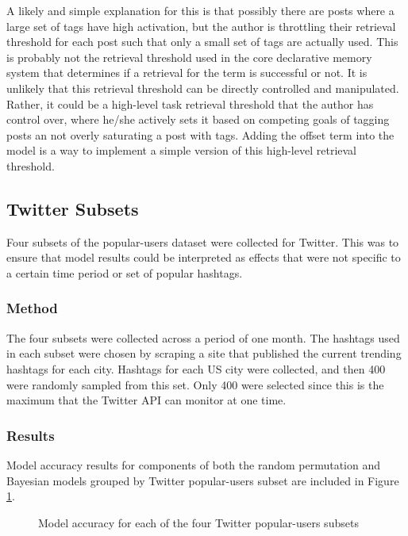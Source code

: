 \documentclass[man,floatsintext,donotrepeattitle]{apa6}
\begin{document}
A likely and simple explanation for this is that possibly there are posts where a large set of tags have high activation,
but the author is throttling their retrieval threshold for each post such that only a small set of tags are actually used.
This is probably not the retrieval threshold used in the core declarative memory system that determines if a retrieval for the term is successful or not.
It is unlikely that this retrieval threshold can be directly controlled and manipulated.
Rather, it could be a high-level task retrieval threshold that the author has control over, where he/she actively sets it based on competing goals of tagging posts an not overly saturating a post with tags.
Adding the offset term into the model is a way to implement a simple version of this high-level retrieval threshold.

\subsection{Twitter Subsets}

Four subsets of the popular-users dataset were collected for Twitter.
This was to ensure that model results could be interpreted as effects that were not specific to a certain time period or set of popular hashtags.

\subsubsection{Method}

The four subsets were collected across a period of one month.
The hashtags used in each subset were chosen by scraping a site that published the current trending hashtags for each city.
Hashtags for each US city were collected, and then 400 were randomly sampled from this set.
Only 400 were selected since this is the maximum that the Twitter API can monitor at one time.

\subsubsection{Results}

Model accuracy results for components of both the random permutation and Bayesian models grouped by Twitter popular-users subset are included in Figure \ref{figContextSubsets}.

\begin{figure}[!htbp]
  \caption{Model accuracy for each of the four Twitter popular-users subsets}
  \label{figContextSubsets}
\end{figure}
\end{document}
